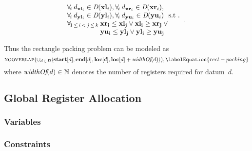 \begin{definition}
\begin{displaymath}
\begin{array}{c}
{\begin{array}{@{}l@{}}
                       \forall_{\! i} \: d_{\mVar{xl}_i} \in \mDomain(\mVar{xl}_i),
                       \forall_{\! i} \: d_{\mVar{xr}_i} \in \mDomain(\mVar{xr}_i),
                       \\
                       \forall_{\! i} \: d_{\mVar{yl}_i} \in \mDomain(\mVar{yl}_i),
                       \forall_{\! i} \: d_{\mVar{yu}_i} \in \mDomain(\mVar{yu}_i)
                       \text{ \st} \\
                       \begin{array}{@{}r@{\:}l@{}}
                           \forall_{\! 1 \,\leq\, i \,<\, j \,\leq\, k}
                         & \mVar{xr_i} \leq \mVar{xl_j} \mOr
                           \mVar{xl_i} \geq \mVar{xr_j} \mOr \mbox{} \\
                         & \mVar{yu_i} \leq \mVar{yl_j} \mOr
                           \mVar{yl_i} \geq \mVar{yu_j}
                       \end{array}
                     \end{array}
                   }\!.
    \end{array}
  \end{displaymath}
\end{definition}
%
Thus the rectangle packing problem can be modeled as
%
\begin{equation}
  \mNoOverlap\!
  \left(
    \cup_{d \,\in\, \mDataSet}
      \mTuple{
         \mVar{start}[d],
         \mVar{end}[d],
         \mVar{loc}[d],
         \mVar{loc}[d] + \mWidthOf(d)
      }
  \right)\!,
  \labelEquation{rect-packing}
\end{equation}
%
where \mbox{$\operatorname{\textit{widthOf}}(d) \in \mathbb{N}$} denotes the number of
\glspl{register} required for \gls{datum}~$d$\hspace{-1pt}.


\subsection{Global Register Allocation}



\subsubsection{Variables}



\subsubsection{Constraints}

